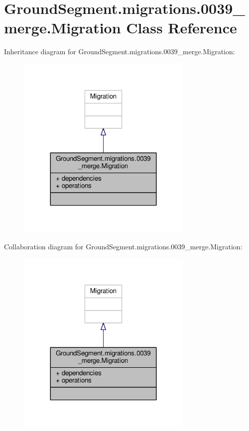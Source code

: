 \hypertarget{class_ground_segment_1_1migrations_1_10039__merge_1_1_migration}{}\section{Ground\+Segment.\+migrations.0039\+\_\+merge.Migration Class Reference}
\label{class_ground_segment_1_1migrations_1_10039__merge_1_1_migration}


Inheritance diagram for Ground\+Segment.\+migrations.0039\+\_\+merge.Migration\+:\nopagebreak
\begin{figure}[H]
\begin{center}
\leavevmode
\includegraphics[width=239pt]{class_ground_segment_1_1migrations_1_10039__merge_1_1_migration__inherit__graph}
\end{center}
\end{figure}


Collaboration diagram for Ground\+Segment.\+migrations.0039\+\_\+merge.Migration\+:\nopagebreak
\begin{figure}[H]
\begin{center}
\leavevmode
\includegraphics[width=239pt]{class_ground_segment_1_1migrations_1_10039__merge_1_1_migration__coll__graph}
\end{center}
\end{figure}
